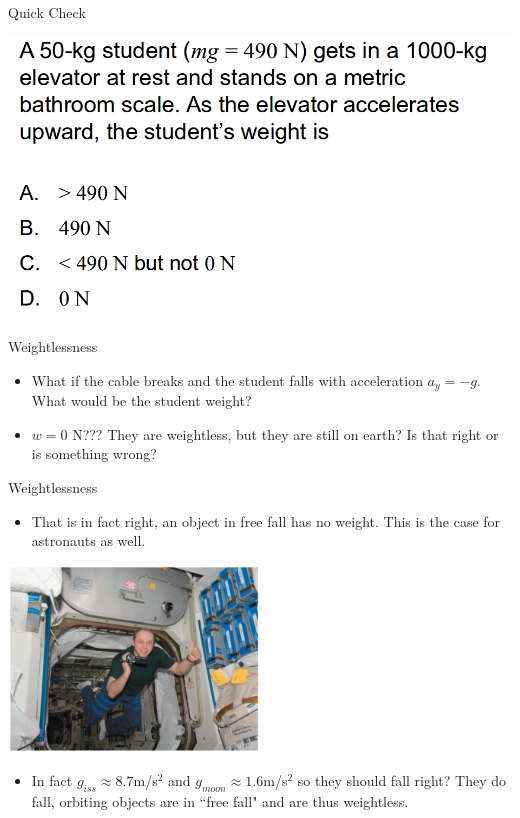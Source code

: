 \documentclass{beamer}
\newcommand{\red}[1]{{\color{red}{#1}}}
\newcommand{\checkL}[2]{\begin{textblock*}{1cm}(#1,#2){\Large \red{\Checkmark}}\end{textblock*}}
\begin{document}
\begin{frame}{Quick Check}
\begin{center}
   \includegraphics[width=\textwidth]{../figures/QC6_9.png}
\end{center}
\only<2>{\checkL{0.9cm}{4.7cm}}
\end{frame}

\begin{frame}{Weightlessness}
\begin{itemize}
   \item What if the cable breaks and the student falls with acceleration $a_y=-g$. What would be the student weight?
   \item<2-> $w=0$ N??? They are weightless, but they are still on earth? Is that right or is something wrong?
\end{itemize}
\end{frame}

\begin{frame}{Weightlessness}
\begin{itemize}
   \item That is in fact right, an object in free fall has no weight. This is the case for astronauts as well.
\end{itemize}
\begin{center}
   \includegraphics[width=0.5\textwidth]{../figures/06_Pg140_UnFigure.jpg}
\end{center}
\begin{itemize}
   \item In fact $g_{iss} \approx 8.7$m/s$^2$ and $g_{moon} \approx 1.6$m/s$^2$ so they should fall right? They do fall, orbiting objects are in ``free fall" and are thus weightless.
\end{itemize}
\end{frame}
\end{document}
